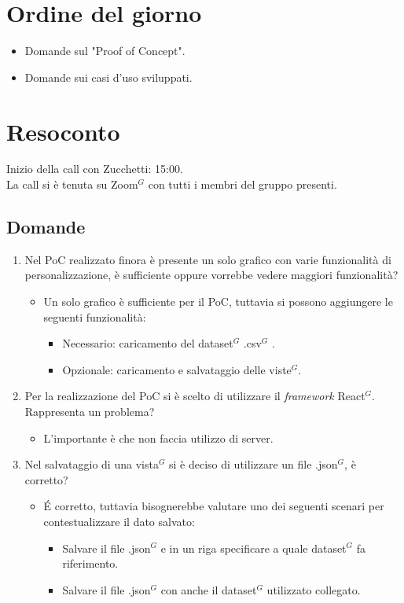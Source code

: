 \section{Ordine del giorno}

\begin{itemize}
	\item Domande sul "Proof of Concept".
	\item Domande sui casi d'uso sviluppati.
\end{itemize}

\section{Resoconto}
\label{sec:Resoconto}

\noindent 
Inizio della call con Zucchetti: 15:00. \\
\noindent La call si è tenuta su Zoom$^{G}$ con tutti i membri del gruppo presenti.

\subsection{Domande}
\begin{enumerate}
	\item Nel PoC realizzato finora è presente un solo grafico con varie funzionalità di personalizzazione, è sufficiente oppure vorrebbe vedere maggiori funzionalità?
	\begin{itemize}
		\item Un solo grafico è sufficiente per il PoC, tuttavia si possono aggiungere le seguenti funzionalità:
		\begin{itemize}
			\item Necessario: caricamento del dataset$^{G}$ .csv$^{G}$ .
			\item Opzionale: caricamento e salvataggio delle viste$^{G}$.
		\end{itemize}
	\end{itemize}
	\item Per la realizzazione del PoC si è scelto di utilizzare il \textit{framework} React$^{G}$. Rappresenta un problema?
	\begin{itemize}
		\item L'importante è che non faccia utilizzo di server.
	\end{itemize}
	\item Nel salvataggio di una vista$^{G}$ si è deciso di utilizzare un file .json$^{G}$, è corretto?
	\begin{itemize}
		\item \' E corretto, tuttavia bisognerebbe valutare uno dei seguenti scenari per contestualizzare il dato salvato:
		\begin{itemize}
			\item Salvare il file .json$^{G}$ e in un riga specificare a quale dataset$^{G}$ fa riferimento.
			\item Salvare il file .json$^{G}$ con anche il dataset$^{G}$ utilizzato collegato.
		\end{itemize}
	\end{itemize}
\end{enumerate}

